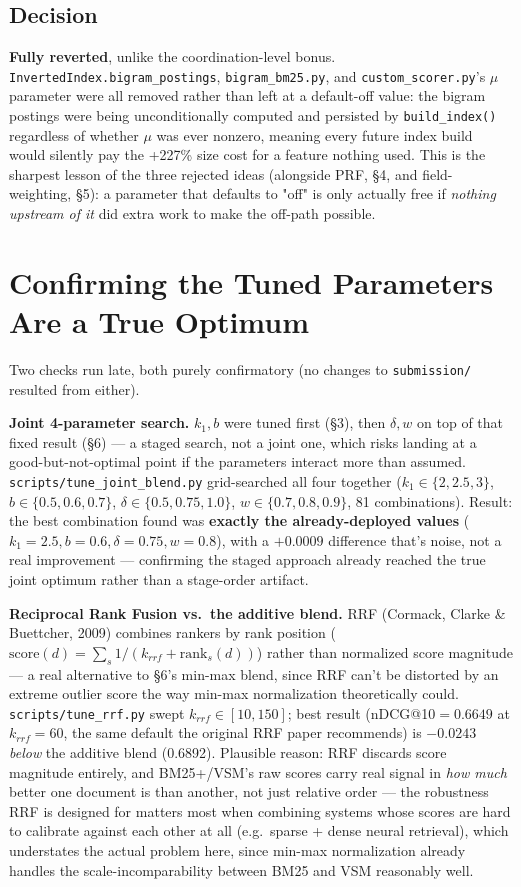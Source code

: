 \documentclass[11pt]{article}
\begin{document}
\subsection{Decision}
\textbf{Fully reverted}, unlike the coordination-level bonus.
\texttt{InvertedIndex.bigram\_postings}, \texttt{bigram\_bm25.py}, and
\texttt{custom\_scorer.py}'s $\mu$ parameter were all removed rather than
left at a default-off value: the bigram postings were being
unconditionally computed and persisted by \texttt{build\_index()}
regardless of whether $\mu$ was ever nonzero, meaning every future index
build would silently pay the +227\% size cost for a feature nothing
used. This is the sharpest lesson of the three rejected ideas
(alongside PRF, \S 4, and field-weighting, \S 5): a parameter that
defaults to "off" is only actually free if \emph{nothing upstream of
it} did extra work to make the off-path possible.

\section{Confirming the Tuned Parameters Are a True Optimum}

Two checks run late, both purely confirmatory (no changes to
\texttt{submission/} resulted from either).

\textbf{Joint 4-parameter search.} $k_1,b$ were tuned first (\S 3), then
$\delta,w$ on top of that fixed result (\S 6) --- a staged search, not a
joint one, which risks landing at a good-but-not-optimal point if the
parameters interact more than assumed. \texttt{scripts/tune\_joint\_blend.py}
grid-searched all four together ($k_1\in\{2,2.5,3\}$,
$b\in\{0.5,0.6,0.7\}$, $\delta\in\{0.5,0.75,1.0\}$, $w\in\{0.7,0.8,0.9\}$,
81 combinations). Result: the best combination found was \textbf{exactly
the already-deployed values} ($k_1{=}2.5,b{=}0.6,\delta{=}0.75,w{=}0.8$),
with a $+0.0009$ difference that's noise, not a real improvement ---
confirming the staged approach already reached the true joint optimum
rather than a stage-order artifact.

\textbf{Reciprocal Rank Fusion vs.\ the additive blend.} RRF (Cormack,
Clarke \& Buettcher, 2009) combines rankers by rank position
($\text{score}(d) = \sum_s 1/(k_{rrf} + \text{rank}_s(d))$) rather than
normalized score magnitude --- a real alternative to \S 6's min-max
blend, since RRF can't be distorted by an extreme outlier score the way
min-max normalization theoretically could. \texttt{scripts/tune\_rrf.py}
swept $k_{rrf} \in [10,150]$; best result (nDCG@10${=}0.6649$ at
$k_{rrf}{=}60$, the same default the original RRF paper recommends) is
$-0.0243$ \emph{below} the additive blend (0.6892). Plausible reason:
RRF discards score magnitude entirely, and BM25+/VSM's raw scores carry
real signal in \emph{how much} better one document is than another, not
just relative order --- the robustness RRF is designed for matters most
when combining systems whose scores are hard to calibrate against each
other at all (e.g.\ sparse + dense neural retrieval), which understates
the actual problem here, since min-max normalization already handles the
scale-incomparability between BM25 and VSM reasonably well.
\end{document}

